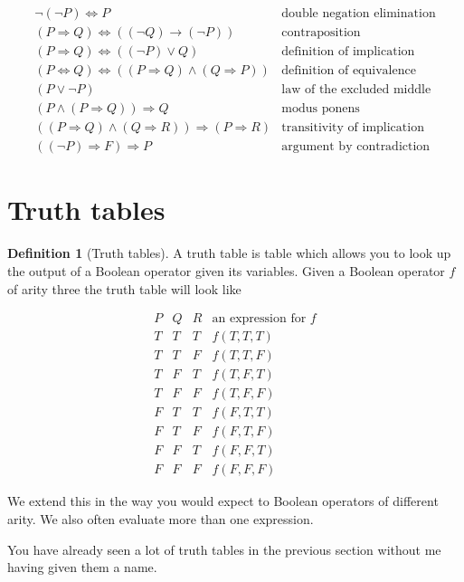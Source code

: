 \documentclass[
]{book}
\theoremstyle{definition}
\newtheorem{definition}{Definition}[chapter]
\theoremstyle{definition}
\theoremstyle{definition}
\theoremstyle{definition}
\theoremstyle{remark}
\begin{document}
\begin{equation}
\begin{array}{lr}
\neg (\neg P) \Leftrightarrow P & \mbox{double negation elimination}\\
(P \Rightarrow Q) \Leftrightarrow ((\neg Q) \rightarrow (\neg P)) & \mbox{contraposition}\\
(P \Rightarrow Q) \Leftrightarrow ((\neg P) \vee Q) & \mbox{definition of implication}\\
(P \Leftrightarrow Q) \Leftrightarrow ((P \Rightarrow Q) \wedge (Q \Rightarrow P)) & \mbox{definition of equivalence}\\
(P \vee \neg P) & \mbox{law of the excluded middle}\\
(P \wedge (P \Rightarrow Q)) \Rightarrow Q & \mbox{modus ponens}\\
((P \Rightarrow Q) \wedge (Q \Rightarrow R)) \Rightarrow (P \Rightarrow R) & \mbox{transitivity of implication}\\
((\neg P)\Rightarrow F)\Rightarrow P & \mbox{argument by contradiction}
\end{array}
\end{equation}

\section{Truth tables}\label{truth-tables}

\begin{definition}[Truth tables]
A truth table is table which allows you to look up the output of a Boolean operator given its variables. Given a Boolean operator \(f\) of arity three the truth table will look like

\begin{equation}
\begin{array}{ccc|c}
P & Q & R & \mbox{an expression for \(f\)} \\
\hline
T & T & T & f(T,T,T)\\
T & T & F & f(T,T,F)\\
T & F & T & f(T,F,T)\\
T & F & F & f(T,F,F)\\
F & T & T & f(F,T,T)\\
F & T & F & f(F,T,F)\\
F & F & T & f(F,F,T)\\
F & F & F & f(F,F,F)
\end{array}
\end{equation}

We extend this in the way you would expect to Boolean operators of different arity. We also often evaluate more than one expression.

You have already seen a lot of truth tables in the previous section without me having given them a name.
\end{definition}
\end{document}
